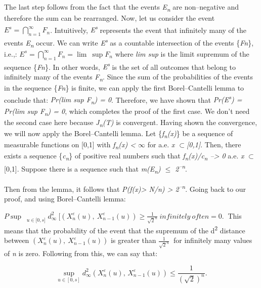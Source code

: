 \documentclass[12pt,a4paper]{report}
\numberwithin{equation}{section}
\begin{document}
The last step follows from the fact that the events
\emph{E\textsubscript{n}} are non--negative and therefore the sum can be
rearranged. Now, let us consider the event
\(E^{s} = \bigcap_{n = 1}^{\infty}F_{n}\). Intuitively,
\emph{E\textsuperscript{s}} represents the event that infinitely many of
the events \emph{E\textsubscript{n}} occur. We can write
\emph{E\textsuperscript{s}} as a countable intersection of the events
\{\emph{Fn}\}, i.e.,:
\(E^{s} = \bigcap_{n = 1}^{\infty}F_{n} = {\lim\ \sup}F_{n}\) where
\emph{lim sup} is the limit supremum of the sequence \{\emph{Fn}\}. In
other words, \emph{E\textsuperscript{s}} is the set of all outcomes that
belong to infinitely many of the events \emph{F\textsubscript{n}}. Since
the sum of the probabilities of the events in the sequence \{\emph{Fn}\}
is finite, we can apply the first Borel--Cantelli lemma to conclude that:
\emph{Pr(lim sup F\textsubscript{n}) = 0}. Therefore, we have shown that
\emph{Pr(E\textsuperscript{s}) = Pr(lim sup F\textsubscript{n}) = 0},
which completes the proof of the first case. We don't need the second
case here because \emph{J\textsubscript{n}(T)} is convergent. Having
shown the convergence, we will now apply the Borel--Cantelli lemma. Let
\{\emph{f\textsubscript{n}(x)}\} be a sequence of measurable functions
on {[}0,1{]} with \emph{\textbar f\textsubscript{n}(x)\textbar{}
\textless{} $\infty$} for a.e. \emph{x $\subset${[}0,1{]}}. Then, there exists a
sequence \{\emph{c\textsubscript{n}}\} of positive real numbers such
that \emph{f\textsubscript{n}(x)/c\textsubscript{n} --\textgreater{} 0}
a.e. \emph{x} $\subset${[}0,1{]}. Suppose there is a sequence such that
\emph{m(E\textsubscript{n}) $\leq$ 2\textsuperscript{--n}}.

Then from the lemma, it follows that
\emph{P(\textbar f(x)\textbar\textgreater{} N/n) \textgreater{}
2\textsuperscript{--n}}. Going back to our proof, and using
Borel--Cantelli lemma:

\({P\sup_{\ \ \ \ \ u \in \lbrack 0,s\rbrack}}{d_{\infty}^{2}\ \lbrack\left( X_{n}^{\varepsilon}(u),\ X_{n - 1}^{\varepsilon}(u) \right) \geq \frac{1}{{\sqrt{2}}^{n}}\ infinitely\ often = 0.\ }\)
This means that the probability of the event that the supremum of the
d\textsuperscript{2} distance between
\(\left( X_{n}^{\varepsilon}(u),\ X_{n - 1}^{\varepsilon}(u) \right)\)
is greater than \(\frac{1}{{\sqrt{2}}^{n}}\ \) for infinitely many
values of \emph{n} is zero. Following from this, we can say that:

\begin{equation}\tag{5.1.19}\label{eq:5.1.19}
\sup_{u\in[0,s]}
d_{\infty}^{2}\!\left(X_{n}^{\varepsilon}(u),\,X_{n-1}^{\varepsilon}(u)\right)
\le \frac{1}{(\sqrt{2})^{n}} .
\end{equation}
\end{document}
